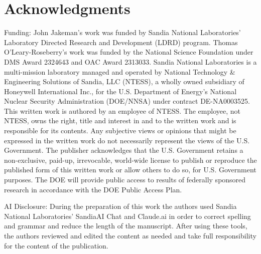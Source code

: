 \documentclass[a4paper,10pt]{article}
\begin{document}
\section*{Acknowledgments}
Funding: John Jakeman's work was funded by Sandia National Laboratories’ Laboratory Directed Research and Development (LDRD) program.
Thomas O'Leary-Roseberry's work was funded by the National Science Foundation under DMS Award 2324643 and OAC Award 2313033.
Sandia National Laboratories is a multi-mission laboratory managed and operated by National Technology \& Engineering Solutions of Sandia, LLC (NTESS), a wholly owned subsidiary of Honeywell International Inc., for the U.S. Department of Energy’s National Nuclear Security Administration (DOE/NNSA) under contract DE-NA0003525.
This written work is authored by an employee of NTESS. 
The employee, not NTESS, owns the right, title and interest in and to the written work and is responsible for its contents.
Any subjective views or opinions that might be expressed in the written work do not necessarily represent the views of the U.S. Government.
The publisher acknowledges that the U.S. Government retains a non-exclusive, paid-up, irrevocable, world-wide license to publish or reproduce the published form of this written work or allow others to do so, for U.S. Government purposes.
The DOE will provide public access to results of federally sponsored research in accordance with the DOE Public Access Plan.

AI Disclosure: During the preparation of this work the authors used Sandia National Laboratories' SandiaAI Chat and Claude.ai in order to correct spelling and grammar and reduce the length of the manuscript.
After using these tools, the authors reviewed and edited the content as needed and take full responsibility for the content of the publication. 



\end{document}
